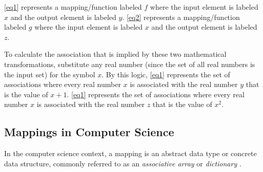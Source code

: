 \ref{eq1} represents a mapping/function labeled \begin{math}f\end{math} where the input element is labeled \begin{math}x\end{math} and the output element is labeled \begin{math}y\end{math}. \ref{eq2} represents a mapping/function labeled \begin{math}g\end{math} where the input element is labeled \begin{math}x\end{math} and the output element is labeled \begin{math}z\end{math}. 

To calculate the association that is implied by these two mathematical transformations, substitute any real number (since the set of all real numbers is the input set) for the symbol \begin{math}x\end{math}. By this logic, \ref{eq1} represents the set of associations where every real number \begin{math}x\end{math} is associated with the real number \begin{math}y\end{math} that is the value of \begin{math}x + 1\end{math}. \ref{eq1} represents the set of associations where every real number \begin{math}x\end{math} is associated with the real number \begin{math}z\end{math} that is the value of \begin{math}x^{2}\end{math}.

\subsection{Mappings in Computer Science}

In the computer science context, a mapping is an abstract data type or concrete data structure, commonly referred to as an \emph{associative array} or \emph{dictionary} \cite{assocarray2008}.  

